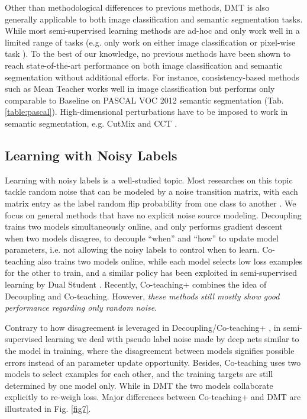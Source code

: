 \documentclass[preprint,review,10pt]{elsarticle}
\begin{document}
Other than methodological differences to previous methods, DMT is also generally applicable to both image classification and semantic segmentation tasks. While most semi-supervised learning methods are ad-hoc and only work well in a limited range of tasks (e.g. only work on either image classification \cite{tarvainen2017mean} or pixel-wise task \cite{ke2020gct}). To the best of our knowledge, no previous methods have been shown to reach state-of-the-art performance on both image classification and semantic segmentation without additional efforts. For instance, consistency-based methods such as Mean Teacher \cite{tarvainen2017mean} works well in image classification but performs only comparable to Baseline on PASCAL VOC 2012 semantic segmentation (Tab. \ref{table:pascal}). High-dimensional perturbations have to be imposed to work in semantic segmentation, e.g. CutMix \cite{french2019semisupervised} and CCT \cite{ouali2020semi}.

\subsection{Learning with Noisy Labels}
\label{sec:62}
Learning with noisy labels is a well-studied topic. Most researches on this topic tackle random noise that can be modeled by a noise transition matrix, with each matrix entry as the label random flip probability from one class to another \cite{angluin1988learning,goldberger2017training}. We focus on general methods that have no explicit noise source modeling. Decoupling \cite{malach2017decoupling} trains two models simultaneously online, and only performs gradient descent when two models disagree, to decouple ``when'' and ``how'' to update model parameters, i.e. not allowing the noisy labels to control when to learn. Co-teaching \cite{han2018co} also trains two models online, while each model selects low loss examples for the other to train, and a similar policy has been exploited in semi-supervised learning by Dual Student \cite{ke2019dual}. Recently, Co-teaching+ \cite{yu2019does} combines the idea of Decoupling and Co-teaching. However, \textit{these methods still mostly show good performance regarding only random noise}.

Contrary to how disagreement is leveraged in Decoupling/Co-teaching+ \cite{malach2017decoupling,yu2019does}, in semi-supervised learning we deal with pseudo label noise made by deep nets similar to the model in training, where the disagreement between models signifies possible errors instead of an parameter update opportunity. Besides, Co-teaching \cite{han2018co} uses two models to select examples for each other, and the training targets are still determined by one model only. While in DMT the two models collaborate explicitly to re-weigh loss. Major differences between Co-teaching+ and DMT are illustrated in Fig. \ref{fig7}.
\end{document}
